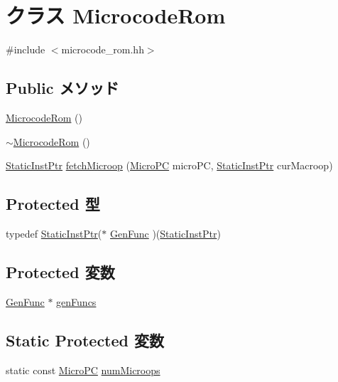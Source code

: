 \hypertarget{classX86ISAInst_1_1MicrocodeRom}{
\section{クラス MicrocodeRom}
\label{classX86ISAInst_1_1MicrocodeRom}
}


{\ttfamily \#include $<$microcode\_\-rom.hh$>$}\subsection*{Public メソッド}
\begin{DoxyCompactItemize}
\item 
\hyperlink{classX86ISAInst_1_1MicrocodeRom_af15b9bcd4d23996cd669840dd56284da}{MicrocodeRom} ()
\item 
\hyperlink{classX86ISAInst_1_1MicrocodeRom_a9675155ea04f7b6554273e1eb43792b2}{$\sim$MicrocodeRom} ()
\item 
\hyperlink{classRefCountingPtr}{StaticInstPtr} \hyperlink{classX86ISAInst_1_1MicrocodeRom_afea04fcbdb8244432c1bffdd8c5c097a}{fetchMicroop} (\hyperlink{base_2types_8hh_adfb4d8b20c5abc8be73dd367b16f2d57}{MicroPC} microPC, \hyperlink{classRefCountingPtr}{StaticInstPtr} curMacroop)
\end{DoxyCompactItemize}
\subsection*{Protected 型}
\begin{DoxyCompactItemize}
\item 
typedef \hyperlink{classRefCountingPtr}{StaticInstPtr}($\ast$ \hyperlink{classX86ISAInst_1_1MicrocodeRom_ab8c6dcaab00ed07d03b7947fb11e91b9}{GenFunc} )(\hyperlink{classRefCountingPtr}{StaticInstPtr})
\end{DoxyCompactItemize}
\subsection*{Protected 変数}
\begin{DoxyCompactItemize}
\item 
\hyperlink{classX86ISAInst_1_1MicrocodeRom_ab8c6dcaab00ed07d03b7947fb11e91b9}{GenFunc} $\ast$ \hyperlink{classX86ISAInst_1_1MicrocodeRom_a59ea86dd80d714d6ad4b9f60ee680077}{genFuncs}
\end{DoxyCompactItemize}
\subsection*{Static Protected 変数}
\begin{DoxyCompactItemize}
\item 
static const \hyperlink{base_2types_8hh_adfb4d8b20c5abc8be73dd367b16f2d57}{MicroPC} \hyperlink{classX86ISAInst_1_1MicrocodeRom_a8861d37867bfca2ed636d382cff902f3}{numMicroops}
\end{DoxyCompactItemize}


